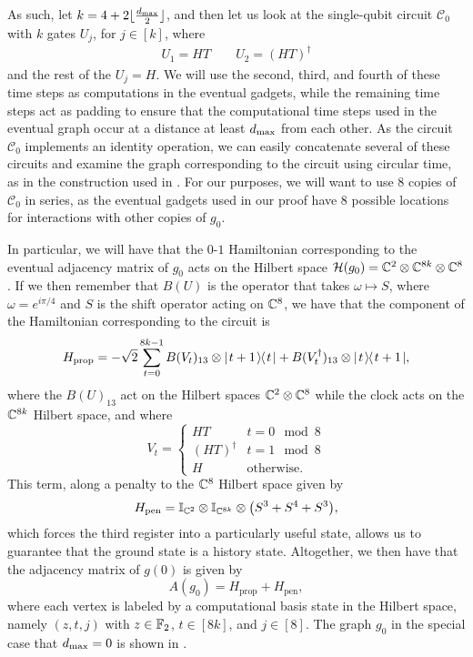 \documentclass[../thesis-main/thesis-main]{subfiles}
\begin{document}
As such, let $k = 4 + 2 \lfloor \frac{d_{\text{max}}}{2}\rfloor$, and then let us look at the single-qubit circuit $\mathcal{C}_0$ with $k$ gates $U_j$, for $j\in[k]$, where 
\begin{align}
U_{1}=HT\qquad U_{2}=\left(HT\right)^{\dagger}
\end{align}
and the rest of the $U_j=H$.  We will use the second, third, and fourth of these time steps as computations in the eventual gadgets, while the remaining time steps act as padding to ensure that the computational time steps used in the eventual graph occur at a distance at least $d_{\text{max}}$ from each other.  As the circuit $\mathcal{C}_0$ implements an identity operation, we can easily concatenate several of these circuits and examine the graph corresponding to the circuit using circular time, as in the construction used in .  For our purposes, we will want to use 8 copies of $\mathcal{C}_0$ in series, as the eventual gadgets used in our proof have 8 possible locations for interactions with other copies of $g_0$.

In particular, we will have that the $0$-$1$ Hamiltonian corresponding to the eventual adjacency matrix of $g_0$ acts on the Hilbert space $\mathcal{H}(g_0) = \mathbb{C}^{2}\otimes \mathbb{C}^{8k} \otimes \mathbb{C}^8$.  If we then remember that $B(U)$ is the operator that takes $\omega \mapsto S$, where $\omega = e^{i \pi/4}$ and  $S$ is the shift operator acting on $\mathbb{C}^{8}$, we have that the component of the Hamiltonian corresponding to the circuit is
\begin{equation}
  H_{\text{prop}} = -\sqrt{2} \sum_{t=0}^{8k-1} B(V_{t})_{13} \otimes |\mspace{2mu} t+1 \mspace{2mu} \rangle\mspace{-2mu}\langle\mspace{2mu} t \mspace{2mu} | + B(V_{t}^\dag)_{13} \otimes |\mspace{2mu} t \mspace{2mu} \rangle\mspace{-2mu}\langle\mspace{2mu} t+1 \mspace{2mu} |,
\end{equation}
where the $B(U)_{13}$ act on the Hilbert spaces $\mathbb{C}^{2}\otimes \mathbb{C}^{8}$ while the clock acts on the $\mathbb{C}^{8k}$ Hilbert space, and where
\begin{equation}
  V_t = \begin{cases}
    HT & t = 0 \mod 8\\
    (HT)^{\dag} & t = 1 \mod 8\\
    H & \text{otherwise}.
  \end{cases}
\end{equation}
This term, along a penalty to the $\mathbb{C}^8$ Hilbert space given by
\begin{equation}
  H_{\text{pen}} = \mathbb{I}_{\mathbb{C}^2} \otimes \mathbb{I}_{\mathbb{C}^{8k}} \otimes \big( S^3 + S^4 + S^3\big),
\end{equation}
which forces the third register into a particularly useful state, allows us to guarantee that the ground state is a history state.  Altogether, we then have that the adjacency matrix of $g(0)$ is given by
\begin{equation}
  A(g_0) = H_{\text{prop}} + H_{\text{pen}},
\end{equation}
where each vertex is labeled by a computational basis state in the Hilbert space, namely $(z,t,j)$ with $z\in \mathbb{F}_2$, $t\in [8k]$, and $j\in[8]$.  The graph $g_0$ in the special case that $d_{\text{max}} = 0$ is shown in .
\end{document}

